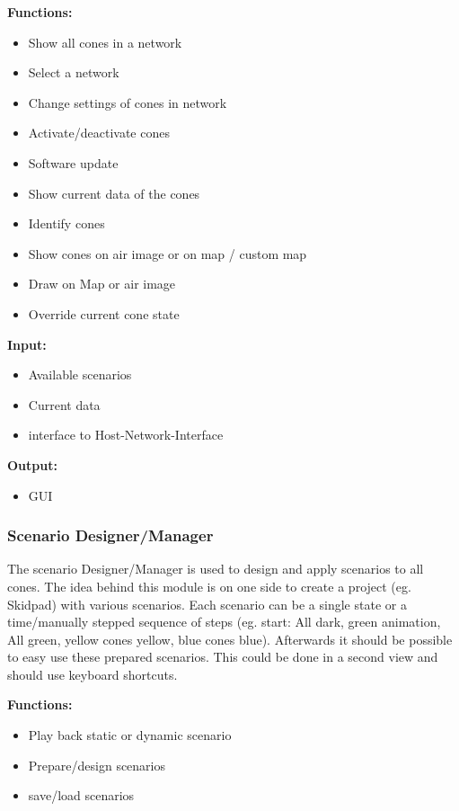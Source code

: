 \textbf{Functions: }

\begin{itemize}
	\item Show all cones in a network
	\item Select a network
	\item Change settings of cones in network
	\item Activate/deactivate cones
	\item Software update
	\item Show current data of the cones
	\item Identify cones
	\item Show cones on air image or on map / custom map
	\item Draw on Map or air image
	\item Override current cone state
\end{itemize}

\textbf{Input:}

\begin{itemize}
	\item Available scenarios
	\item Current data
	\item interface to Host-Network-Interface
\end{itemize}

\textbf{Output:}
\begin{itemize}
	\item \ac{GUI}
\end{itemize}

\subsubsection{Scenario Designer/Manager}
The scenario Designer/Manager is used to design and apply  scenarios to all cones. The idea behind this module is on one side to create a project (eg. Skidpad) with various scenarios. Each scenario can be a single state or a time/manually stepped sequence of steps (eg. start: All dark, green animation, All green, yellow cones yellow, blue cones blue). Afterwards it should be possible to easy use these prepared scenarios. This could be done in a second view and should use keyboard shortcuts. 

\textbf{Functions: }
\begin{itemize}
	\item Play back static or dynamic scenario
	\item Prepare/design scenarios
	\item save/load scenarios
\end{itemize}

